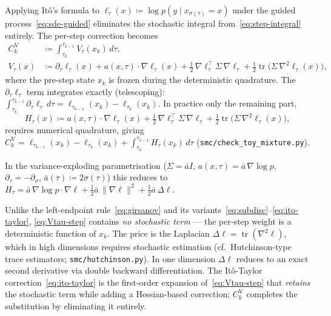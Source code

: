 \documentclass[11pt]{article}
\begin{document}
Applying It\^o's formula to $\ell_\tau(x)\coloneqq\log p(y\mid
x_{\sigma(\tau)}=x)$ under the guided process~\eqref{eq:sde-guided}
eliminates the stochastic integral from~\eqref{eq:step-integral} entirely.
The per-step correction becomes
\begin{align}
  C_k^{\text{V}}
  &\coloneqq \int_{\tau_k}^{\tau_{k-1}} V_\tau(x_k)\,d\tau,
  \label{eq:Vtau-step}\\[2pt]
  V_\tau(x) &\coloneqq \partial_\tau\ell_\tau(x)
              + a(x,\tau)\!\cdot\!\nabla\ell_\tau(x)
              + \tfrac12\,\nabla\ell_\tau^\top\Sigma\,\nabla\ell_\tau
              + \tfrac12\operatorname{tr}\bigl(\Sigma\,\nabla^2\ell_\tau(x)\bigr),
  \label{eq:Vtau-def}
\end{align}
where the pre-step state $x_k$ is frozen during the deterministic quadrature.
The $\partial_\tau\ell_\tau$ term integrates exactly (telescoping):
$\int_{\tau_k}^{\tau_{k-1}}\partial_\tau\ell_\tau\,d\tau = \ell_{\tau_{k-1}}(x_k) - \ell_{\tau_k}(x_k)$.
In practice only the remaining part,
\begin{equation}
  H_\tau(x) \coloneqq a(x,\tau)\!\cdot\!\nabla\ell_\tau(x)
                    + \tfrac12\,\nabla\ell_\tau^\top\Sigma\,\nabla\ell_\tau
                    + \tfrac12\operatorname{tr}\bigl(\Sigma\,\nabla^2\ell_\tau(x)\bigr),
  \label{eq:Htau-def}
\end{equation}
requires numerical quadrature, giving
$C_k^{\text{V}} = \ell_{\tau_{k-1}}(x_k) - \ell_{\tau_k}(x_k) + \int_{\tau_k}^{\tau_{k-1}} H_\tau(x_k)\,d\tau$
(\texttt{smc/check\_toy\_mixture.py}).

In the variance-exploding parametrisation ($\Sigma=\bar a I$,
$a(x,\tau)=\bar a\,\nabla\!\log p$, $\partial_\tau=-\partial_\sigma$,
$\bar a(\tau)\coloneqq 2\sigma(\tau)$) this reduces to
$H_\tau = \bar a\,\nabla\!\log p\!\cdot\!\nabla\ell
        + \tfrac12\bar a\,\|\nabla\ell\|^2
        + \tfrac12\bar a\,\Delta\ell$.

Unlike the left-endpoint rule~\eqref{eq:girsanov} and its
variants~\eqref{eq:subdisc}--\eqref{eq:ito-taylor},
\eqref{eq:Vtau-step} contains \emph{no stochastic term} --- the per-step
weight is a deterministic function of $x_k$.
The price is the Laplacian $\Delta\ell=\operatorname{tr}(\nabla^2\ell)$,
which in high dimensions requires stochastic estimation
(cf.\ Hutchinson-type trace estimators; \texttt{smc/hutchinson.py}).
In one dimension $\Delta\ell$ reduces to an exact second derivative via
double backward differentiation.
The It\^o-Taylor correction~\eqref{eq:ito-taylor} is the first-order
expansion of~\eqref{eq:Vtau-step} that \emph{retains} the stochastic term
while adding a Hessian-based correction;
$C_k^{\text{V}}$ completes the substitution by eliminating it entirely.



\end{document}
